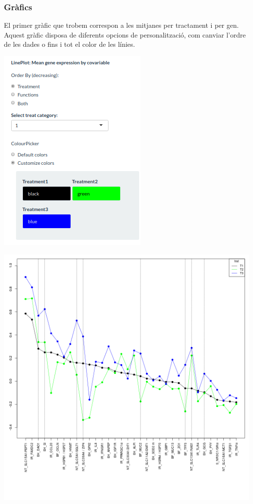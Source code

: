 \documentclass[english]{article}
\begin{document}
\subsubsection{Gràfics}
El primer gràfic que trobem correspon a les mitjanes per tractament i per gen. Aquest gràfic disposa de diferents opcions de personalització, com canviar l'ordre de les dades o fins i tot el color de les línies.
\begin{center}
\includegraphics[scale=0.5]{app7.png}
\end{center}
\clearpage
\onecolumn
\begin{center}
\includegraphics[scale=0.4]{app8.png}
\end{center}
\end{document}
